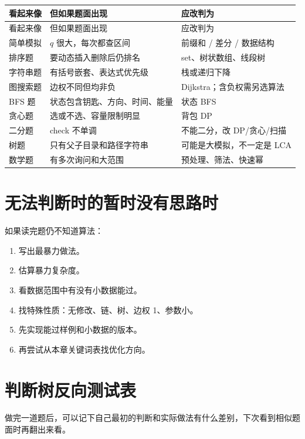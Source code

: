 \begin{longtable}{p{4.5cm}p{4.8cm}p{4.8cm}}
\toprule
看起来像 & 但如果题面出现 & 应改判为 \\
\midrule
\endfirsthead
\toprule
看起来像 & 但如果题面出现 & 应改判为 \\
\midrule
\endhead
简单模拟 & $q$ 很大，每次都查区间 & 前缀和 / 差分 / 数据结构 \\
排序题 & 要动态插入删除后仍排名 & set、树状数组、线段树 \\
字符串题 & 有括号嵌套、表达式优先级 & 栈或递归下降 \\
图搜索题 & 边权不同但均非负 & Dijkstra；含负权需另选算法 \\
BFS 题 & 状态包含钥匙、方向、时间、能量 & 状态 BFS \\
贪心题 & 选或不选、容量限制明显 & 背包 DP \\
二分题 & check 不单调 & 不能二分，改 DP/贪心/扫描 \\
树题 & 只有父子目录和路径字符串 & 可能是大模拟，不一定是 LCA \\
数学题 & 有多次询问和大范围 & 预处理、筛法、快速幂 \\
\bottomrule
\end{longtable}

\section{无法判断时的暂时没有思路时}\label{sec:03-20}

如果读完题仍不知道算法：

\begin{enumerate}
  \item 写出最暴力做法。
  \item 估算暴力复杂度。
  \item 看数据范围中有没有小数据能过。
  \item 找特殊性质：无修改、链、树、边权 1、参数小。
  \item 先实现能过样例和小数据的版本。
  \item 再尝试从本章关键词表找优化方向。
\end{enumerate}

\section{判断树反向测试表}\label{sec:03-21}

做完一道题后，可以记下自己最初的判断和实际做法有什么差别，下次看到相似题面时再翻出来看。

